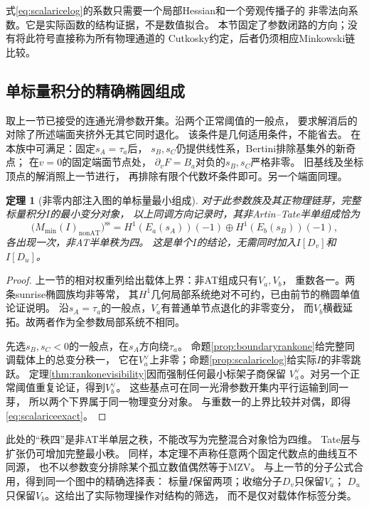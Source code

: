 \documentclass[11pt,a4paper]{ctexart}
\theoremstyle{cnplain}\newtheorem{theorem}{定理}[section]
\theoremstyle{definition}\newtheorem{definition}[theorem]{定义}
\theoremstyle{remark}\newtheorem{remark}[theorem]{注}
\begin{document}
式\eqref{eq:scalaricelog}的系数只需要一个局部Hessian和一个旁观传播子的
非零法向系数。它是实际函数的结构证据，不是数值拟合。
本节固定了参数闭路的方向；没有将此符号直接称为所有物理通道的
Cutkosky约定，后者仍须相应Minkowski链比较。

\subsection{单标量积分的精确椭圆组成}
取上一节已接受的连通光滑参数开集。沿两个正常阈值的一般点，
要求解消后的对除了所述端面夹挤外无其它同时退化。
该条件是几何适用条件，不能省去。
在本族中可满足：固定$s_A=\tau_a$后，
$s_B,s_C$仍提供线性系，Bertini排除基集外的新奇点；
在$v=0$的固定端面节点处，
$\partial_vF=B_a$对负的$s_B,s_C$严格非零。
旧基线及坐标顶点的解消照上一节进行，
再排除有限个代数坏条件即可。另一个端面同理。

\begin{theorem}[非零内部注入图的单标量最小组成]\label{thm:scalaricevisibility}
对于此参数族及其正物理链芽，完整标量积分$I$的最小变分对象，
以上同调方向记录时，其非Artin--Tate半单组成恰为
\begin{equation}\label{eq:scalariceexact}
 \bigl(M_{\min}(I)_{\mathrm{nonAT}}\bigr)^{\mathrm{ss}}
       =H^1(E_a(s_A))(-1)\oplus H^1(E_b(s_B))(-1),
\end{equation}
各出现一次，非AT半单秩为四。
这是单个$I$的结论，无需同时加入$I[D_v]$和$I[D_u]$。
\end{theorem}
\begin{proof}
上一节的相对权重列给出载体上界：非AT组成只有$V_a,V_b$，
重数各一。两条sunrise椭圆族均非等常，
其$H^1$几何局部系统绝对不可约，已由前节的椭圆单值论证说明。
沿$s_A=\tau_a$的一般点，$V_a$有普通单节点退化的非零变分，
而$V_b$横截延拓。故两者作为全参数局部系统不相同。

先选$s_B,s_C<0$的一般点，在$s_A$方向绕$\tau_a$。
命题\ref{prop:boundaryrankone}给完整同调载体上的总变分秩一，
它在$V_a^\vee$上非零；命题\ref{prop:scalaricelog}给实际$I$的非零跳跃。
定理\ref{thm:rankonevisibility}因而强制任何最小标架子商保留
$V_a^\vee$。对另一个正常阈值重复论证，得到$V_b^\vee$。
这些基点可在同一光滑参数开集内平行运输到同一芽，
所以两个下界属于同一物理变分对象。
与重数一的上界比较并对偶，即得\eqref{eq:scalariceexact}。
\end{proof}

此处的“秩四”是非AT半单层之秩，不能改写为完整混合对象恰为四维。
Tate层与扩张仍可增加完整最小秩。
同样，本定理不声称任意两个固定代数点的曲线互不同源，
也不以参数变分排除某个孤立数值偶然等于MZV。
与上一节的分子公式合用，得到同一个图中的精确选择表：
标量$I$保留两项；收缩分子$D_v$只保留$V_a$；
$D_u$只保留$V_b$。这给出了实际物理操作对结构的筛选，
而不是仅对载体作标签分类。
\end{document}
